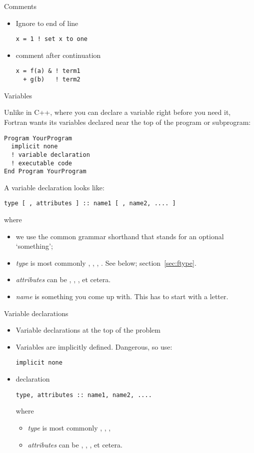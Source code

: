 \begin{slide}{Comments}
  \label{sl:fcomment}
  \begin{itemize}
  \item Ignore to end of line
\begin{lstlisting}
x = 1 ! set x to one
\end{lstlisting}
\item comment after continuation
\begin{lstlisting}
x = f(a) & ! term1 
  + g(b)   ! term2
\end{lstlisting}
  \end{itemize}
\end{slide}

 {Variables}

Unlike in C++, where you can declare a variable right before you need
it, Fortran wants its variables declared near the top of the program
or subprogram:
\begin{lstlisting}
Program YourProgram
  implicit none
  ! variable declaration
  ! executable code
End Program YourProgram
\end{lstlisting}
A variable declaration looks like:
\begin{lstlisting}
type [ , attributes ] :: name1 [ , name2, .... ]
\end{lstlisting}
where
\begin{itemize}
\item we use the common grammar shorthand that \n{[ something ]}
  stands for an optional `something';
\item \textit{type} is most commonly , , ,
  . See below; section~\ref{sec:ftype}.
\item \textit{attributes} can be , ,
  ,  et cetera.
\item \textit{name} is something you come up with. This has to start
  with a letter.
\end{itemize}

\begin{slide}{Variable declarations}
  \label{sl:fvars}
  \begin{itemize}
  \item Variable declarations at the top of the problem
  \item Variables are implicitly defined. Dangerous, so use:
\begin{lstlisting}
implicit none
\end{lstlisting}
\item declaration
\begin{lstlisting}
type, attributes :: name1, name2, ....
\end{lstlisting}
where
\begin{itemize}
\item \textit{type} is most commonly , , ,
\item \textit{attributes} can be , ,
  ,  et cetera.
  \end{itemize}
\end{itemize}
\end{slide}


